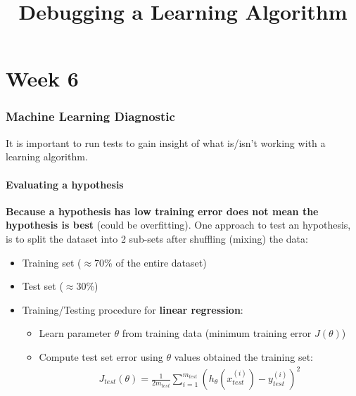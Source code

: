 \documentclass[a4paper,12pt]{report}
\begin{document}
\tableofcontents

\title{Debugging a Learning Algorithm}
\maketitle
\part{Week 6}
\section{Machine Learning Diagnostic}
It is important to run tests to gain insight of what is/isn't working with a learning algorithm.

\subsection{Evaluating a hypothesis }
\textbf{Because a hypothesis has low training error does not mean the hypothesis is best} (could be overfitting).
One approach to test an hypothesis, is to split the dataset into 2 sub-sets after shuffling (mixing)  the data:
\begin{itemize}
\item Training set ($\approx$70\% of the entire dataset)
\item Test set ($\approx$30\%)
\end{itemize}

\begin{itemize}
\item Training/Testing procedure for \textbf{linear regression}:
\begin{itemize}
	\item Learn parameter $\theta$ from training data (minimum training error $J(\theta)$)
	\item Compute test set error using $\theta$ values obtained the training set:
	\begin{align}
	J_{test} (\theta) = \frac{1}{2 m_{test}} \sum_{i=1} ^{m_{test}} \left(h_{\theta}(x_{test} ^{(i)}) - y_{test} ^{(i)} \right)^2
	\end{align}
\end{itemize}
\end{itemize}
\end{document}
